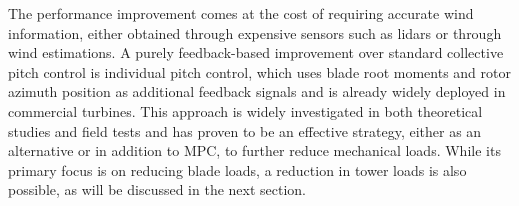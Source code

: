 The performance improvement comes at the cost of requiring accurate wind information, either obtained through expensive sensors such as lidars or through wind estimations. A purely feedback-based improvement over standard collective pitch control is individual pitch control, which uses blade root moments and rotor azimuth position as additional feedback signals and is already widely deployed in commercial turbines. This approach is widely investigated in both theoretical studies and field tests and has proven to be an effective strategy, either as an alternative or in addition to MPC, to further reduce mechanical loads. While its primary focus is on reducing blade loads, a reduction in tower loads is also possible, as will be discussed in the next section.

